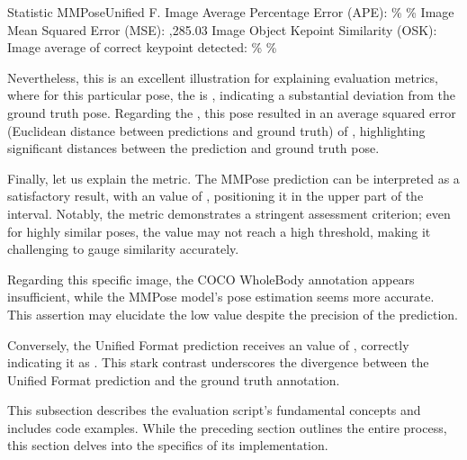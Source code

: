  \setupTABLE[r][1][style=bold]
 \setupTABLE[c][each][offset=3dd]
 \setupTABLE[frame=off]
 \setupTABLE[r][1][topframe=on,bottomframe=on]
 \setupTABLE[c][each][leftframe=on]
 \setupTABLE[c][1][leftframe=off]
 \setupTABLE[c][2,3][align=middle]
 \bTR\bTD Statistic \eTD\bTD MMPose\eTD\bTD Unified F.\eTD\eTR
 \bTR\bTD Image Average Percentage Error (APE): \eTD{}\% \eTD{}\% \eTD\eTR
 \bTR\bTD Image Mean Squared Error (MSE): \eTD{} \eTD{},285.03 \eTD\eTR
 \bTR\bTD Image Object Kepoint Similarity (OSK): \eTD{} \eTD{} \eTD\eTR
 \bTR\bTD Image average of correct keypoint detected: \eTD{}\% \eTD{}\% \eTD\eTR

Nevertheless, this is an excellent illustration for explaining evaluation metrics, where for this particular pose, the \pojem{\APE} is , indicating a substantial deviation from the ground truth pose. Regarding the \pojem{\MSE}, this pose resulted in an average squared error (Euclidean distance between predictions and ground truth) of , highlighting significant distances between the prediction and ground truth pose.

Finally, let us explain the \pojem{\OKS} metric. The MMPose prediction can be interpreted as a satisfactory result, with an \pojem{\OKS} value of , positioning it in the upper part of the interval. Notably, the \pojem{\OKS} metric demonstrates a stringent assessment criterion; even for highly similar poses, the value may not reach a high threshold, making it challenging to gauge similarity accurately.

Regarding this specific image, the COCO WholeBody annotation appears insufficient, while the MMPose model's pose estimation seems more accurate. This assertion may elucidate the low \pojem{\OKS} value despite the precision of the prediction.

Conversely, the Unified Format prediction receives an \pojem{\OKS} value of , correctly indicating it as . This stark contrast underscores the divergence between the Unified Format prediction and the ground truth annotation.


This subsection describes the evaluation script's fundamental concepts and includes code examples. While the preceding section outlines the entire process, this section delves into the specifics of its implementation.

